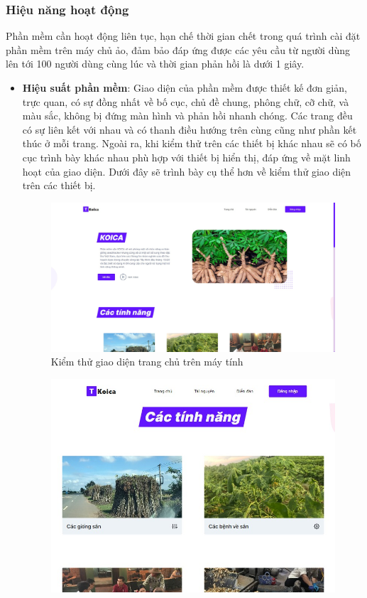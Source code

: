 \documentclass[./../main.tex]{subfiles}
\begin{document}
\subsubsection{Hiệu năng hoạt động}
Phần mềm cần hoạt động liên tục, hạn chế thời gian chết trong quá trình cài đặt phần mềm trên máy chủ ảo, đảm bảo đáp ứng được các yêu cầu từ người dùng lên tới 100 người dùng cùng lúc và thời gian phản hồi là dưới 1 giây.


\begin{itemize}
    \item \textbf{Hiệu suất phần mềm}: Giao diện của phần mềm được thiết kế đơn giản, trực quan, có sự đồng nhất về bố cục, chủ đề chung, phông chữ, cỡ chữ, và màu sắc, không bị đứng màn hình và phản hồi nhanh chóng. Các trang đều có sự liên kết với nhau và có thanh điều hướng trên cùng cũng như phần kết thúc ở mỗi trang. Ngoài ra, khi kiểm thử trên các thiết bị khác nhau sẽ có bố cục trình bày khác nhau phù hợp với thiết bị hiển thị, đáp ứng về mặt linh hoạt của giao diện. Dưới đây sẽ trình bày cụ thể hơn về kiểm thử giao diện trên các thiết bị.
    \begin{figure}[H]
    \centering
        \includegraphics[height=0.34\textheight,keepaspectratio]{./img/test_hp1.jpeg}
        \caption{Kiểm thử giao diện trang chủ trên máy tính}
        \label{test:hp1}
    \end{figure}
    \begin{figure}[H]
    \centering
        \includegraphics[height=0.45\textheight,keepaspectratio]{./img/test_hp2.jpeg}

\end{figure}
\end{itemize}
\end{document}
